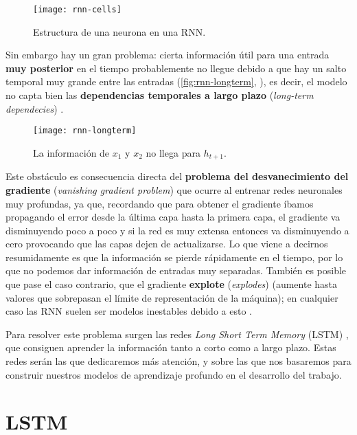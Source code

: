 \begin{figure}[htpb]
  \centering
  \texttt{[image: rnn-cells]}
  \caption{Estructura de una neurona en una RNN.}
  \label{fig:rnn-cells}
\end{figure}

Sin embargo hay un gran problema: cierta información útil para una entrada \textbf{muy posterior} en el tiempo probablemente no llegue debido a que hay un salto temporal muy grande entre las entradas (\autoref{fig:rnn-longterm}, \cite{christopher2015lstm}), es decir, el modelo no capta bien las \textbf{dependencias temporales a largo plazo} (\emph{long-term dependecies}) \cite{bengio1994learning}.

\begin{figure}[htpb]
  \centering
  \texttt{[image: rnn-longterm]}
  \caption{La información de $x_1$ y $x_2$ no llega para $h_{t+1}$.}
  \label{fig:rnn-longterm}
\end{figure}

Este obstáculo es consecuencia directa del \textbf{problema del desvanecimiento del gradiente} (\emph{vanishing gradient problem}) que ocurre al entrenar redes neuronales muy profundas, ya que, recordando que para obtener el gradiente íbamos propagando el error desde la última capa hasta la primera capa, el gradiente va disminuyendo poco a poco y si la red es muy extensa entonces va disminuyendo a cero provocando que las capas dejen de actualizarse. Lo que viene a decirnos resumidamente es que la información se pierde rápidamente en el tiempo, por lo que no podemos dar información de entradas muy separadas. También es posible que pase el caso contrario, que el gradiente \textbf{explote} (\emph{explodes}) (aumente hasta valores que sobrepasan el límite de representación de la máquina); en cualquier caso las RNN suelen ser modelos inestables debido a esto \cite{Goodfellow-et-al-2016}.

Para resolver este problema surgen las redes \emph{Long Short Term Memory} (LSTM) \cite{hochreiter1997long}, que consiguen aprender la información tanto a corto como a largo plazo. Estas redes serán las que dedicaremos más atención, y sobre las que nos basaremos para construir nuestros modelos de aprendizaje profundo en el desarrollo del trabajo.

\section{LSTM}

